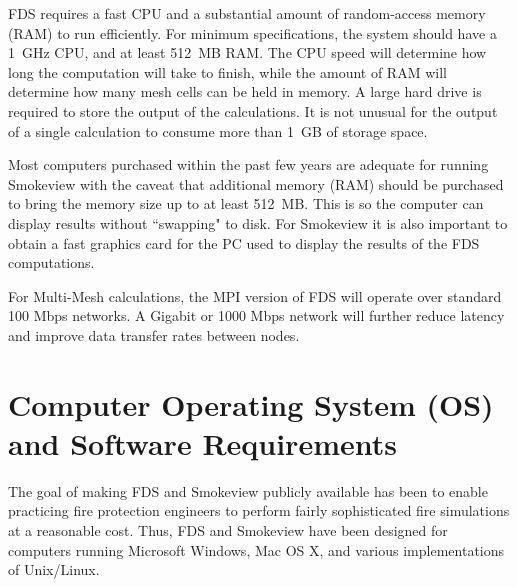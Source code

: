\documentclass[11pt]{book}
\begin{document}
FDS requires a fast CPU and a substantial amount of random-access memory (RAM) to run efficiently.
For minimum specifications, the system should have a 1~GHz CPU, and at least 512~MB RAM.
The CPU speed will determine how long the computation will take to finish, while the amount
of RAM will determine how many mesh cells can be held in memory.
A large hard drive is required to store the output of the calculations. It is not unusual for
the output of a single calculation to consume more than 1~GB of storage space.

Most computers purchased within the past few years are adequate for running Smokeview
with the caveat that additional memory (RAM) should be purchased to bring the
memory size up to at least 512~MB. This is so the computer can display results without
``swapping" to disk. For Smokeview it is also important to obtain a fast graphics card
for the PC used to display the results of the FDS computations.

For Multi-Mesh calculations, the MPI version of FDS will operate over standard 100 Mbps networks.
A Gigabit or 1000 Mbps network will further reduce latency and improve data transfer rates between nodes.


\section{Computer Operating System (OS) and Software Requirements}

The goal of making FDS and Smokeview publicly available has been to enable
practicing fire protection engineers to perform fairly sophisticated
fire simulations at a reasonable cost. Thus, FDS and Smokeview have been
designed for computers running Microsoft Windows, Mac OS X, and various
implementations of Unix/Linux.
\end{document}
